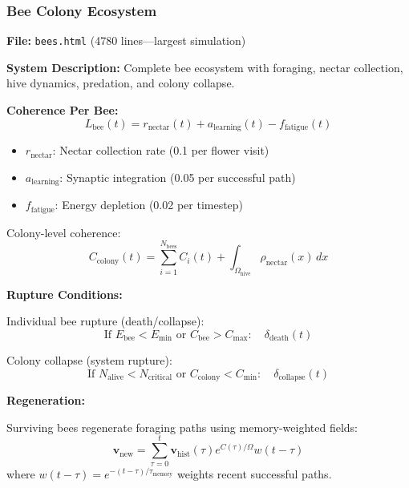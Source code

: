 \documentclass[11pt,a4paper]{article}
\theoremstyle{definition}
\theoremstyle{remark}
\begin{document}
\subsubsection{Bee Colony Ecosystem}

\textbf{File:} \texttt{bees.html} (4780 lines—largest simulation)

\textbf{System Description:} Complete bee ecosystem with foraging, nectar collection, hive dynamics, predation, and colony collapse.

\textbf{Coherence Per Bee:}
\begin{equation}
L_{\text{bee}}(t) = r_{\text{nectar}}(t) + a_{\text{learning}}(t) - f_{\text{fatigue}}(t)
\end{equation}
\begin{itemize}
\item $r_{\text{nectar}}$: Nectar collection rate (0.1 per flower visit)
\item $a_{\text{learning}}$: Synaptic integration (0.05 per successful path)
\item $f_{\text{fatigue}}$: Energy depletion (0.02 per timestep)
\end{itemize}

Colony-level coherence:
\begin{equation}
C_{\text{colony}}(t) = \sum_{i=1}^{N_{\text{bees}}} C_i(t) + \int_{\Omega_{\text{hive}}} \rho_{\text{nectar}}(x)\,dx
\end{equation}

\textbf{Rupture Conditions:}

Individual bee rupture (death/collapse):
\begin{equation}
\text{If } E_{\text{bee}} < E_{\text{min}} \text{ or } C_{\text{bee}} > C_{\text{max}}: \quad \delta_{\text{death}}(t)
\end{equation}

Colony collapse (system rupture):
\begin{equation}
\text{If } N_{\text{alive}} < N_{\text{critical}} \text{ or } C_{\text{colony}} < C_{\text{min}}: \quad \delta_{\text{collapse}}(t)
\end{equation}

\textbf{Regeneration:}

Surviving bees regenerate foraging paths using memory-weighted fields:
\begin{equation}
\mathbf{v}_{\text{new}} = \sum_{\tau=0}^t \mathbf{v}_{\text{hist}}(\tau) e^{C(\tau)/\Omega} w(t-\tau)
\end{equation}
where $w(t-\tau) = e^{-(t-\tau)/\tau_{\text{memory}}}$ weights recent successful paths.
\end{document}
